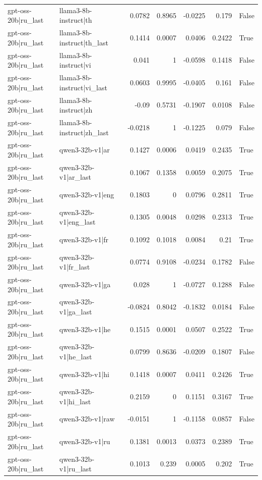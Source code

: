 \begin{table}
\begin{tabular}{l l r r r r l}
gpt-oss-20b|ru_last & llama3-8b-instruct|th & 0.0782 & 0.8965 & -0.0225 & 0.179 & False \\
gpt-oss-20b|ru_last & llama3-8b-instruct|th_last & 0.1414 & 0.0007 & 0.0406 & 0.2422 & True \\
gpt-oss-20b|ru_last & llama3-8b-instruct|vi & 0.041 & 1 & -0.0598 & 0.1418 & False \\
gpt-oss-20b|ru_last & llama3-8b-instruct|vi_last & 0.0603 & 0.9995 & -0.0405 & 0.161 & False \\
gpt-oss-20b|ru_last & llama3-8b-instruct|zh & -0.09 & 0.5731 & -0.1907 & 0.0108 & False \\
gpt-oss-20b|ru_last & llama3-8b-instruct|zh_last & -0.0218 & 1 & -0.1225 & 0.079 & False \\
gpt-oss-20b|ru_last & qwen3-32b-v1|ar & 0.1427 & 0.0006 & 0.0419 & 0.2435 & True \\
gpt-oss-20b|ru_last & qwen3-32b-v1|ar_last & 0.1067 & 0.1358 & 0.0059 & 0.2075 & True \\
gpt-oss-20b|ru_last & qwen3-32b-v1|eng & 0.1803 & 0 & 0.0796 & 0.2811 & True \\
gpt-oss-20b|ru_last & qwen3-32b-v1|eng_last & 0.1305 & 0.0048 & 0.0298 & 0.2313 & True \\
gpt-oss-20b|ru_last & qwen3-32b-v1|fr & 0.1092 & 0.1018 & 0.0084 & 0.21 & True \\
gpt-oss-20b|ru_last & qwen3-32b-v1|fr_last & 0.0774 & 0.9108 & -0.0234 & 0.1782 & False \\
gpt-oss-20b|ru_last & qwen3-32b-v1|ga & 0.028 & 1 & -0.0727 & 0.1288 & False \\
gpt-oss-20b|ru_last & qwen3-32b-v1|ga_last & -0.0824 & 0.8042 & -0.1832 & 0.0184 & False \\
gpt-oss-20b|ru_last & qwen3-32b-v1|he & 0.1515 & 0.0001 & 0.0507 & 0.2522 & True \\
gpt-oss-20b|ru_last & qwen3-32b-v1|he_last & 0.0799 & 0.8636 & -0.0209 & 0.1807 & False \\
gpt-oss-20b|ru_last & qwen3-32b-v1|hi & 0.1418 & 0.0007 & 0.0411 & 0.2426 & True \\
gpt-oss-20b|ru_last & qwen3-32b-v1|hi_last & 0.2159 & 0 & 0.1151 & 0.3167 & True \\
gpt-oss-20b|ru_last & qwen3-32b-v1|raw & -0.0151 & 1 & -0.1158 & 0.0857 & False \\
gpt-oss-20b|ru_last & qwen3-32b-v1|ru & 0.1381 & 0.0013 & 0.0373 & 0.2389 & True \\
gpt-oss-20b|ru_last & qwen3-32b-v1|ru_last & 0.1013 & 0.239 & 0.0005 & 0.202 & True \\

\end{tabular}
\end{table}
